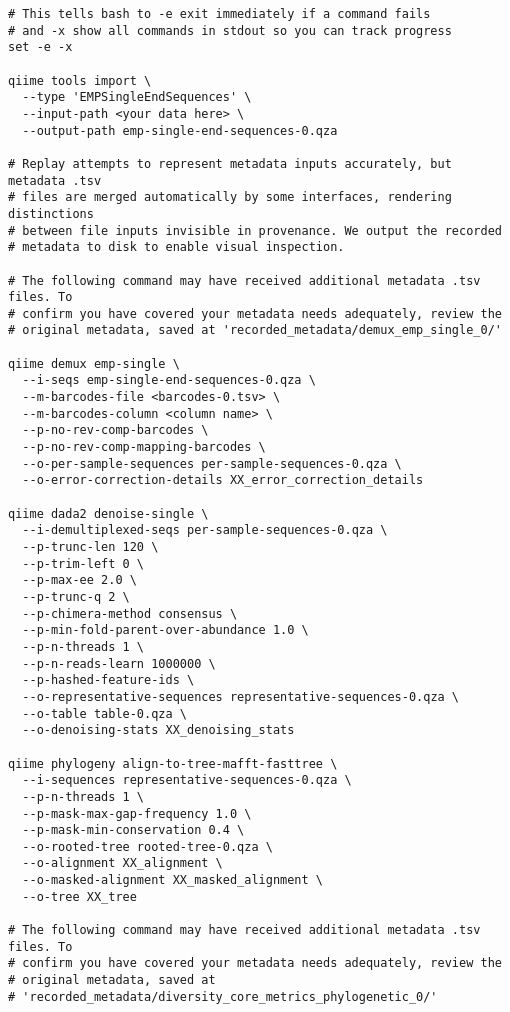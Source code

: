 \begin{footnotesize}
\begin{verbatim}
# This tells bash to -e exit immediately if a command fails
# and -x show all commands in stdout so you can track progress
set -e -x

qiime tools import \
  --type 'EMPSingleEndSequences' \
  --input-path <your data here> \
  --output-path emp-single-end-sequences-0.qza

# Replay attempts to represent metadata inputs accurately, but metadata .tsv
# files are merged automatically by some interfaces, rendering distinctions
# between file inputs invisible in provenance. We output the recorded
# metadata to disk to enable visual inspection.

# The following command may have received additional metadata .tsv files. To
# confirm you have covered your metadata needs adequately, review the
# original metadata, saved at 'recorded_metadata/demux_emp_single_0/'

qiime demux emp-single \
  --i-seqs emp-single-end-sequences-0.qza \
  --m-barcodes-file <barcodes-0.tsv> \
  --m-barcodes-column <column name> \
  --p-no-rev-comp-barcodes \
  --p-no-rev-comp-mapping-barcodes \
  --o-per-sample-sequences per-sample-sequences-0.qza \
  --o-error-correction-details XX_error_correction_details

qiime dada2 denoise-single \
  --i-demultiplexed-seqs per-sample-sequences-0.qza \
  --p-trunc-len 120 \
  --p-trim-left 0 \
  --p-max-ee 2.0 \
  --p-trunc-q 2 \
  --p-chimera-method consensus \
  --p-min-fold-parent-over-abundance 1.0 \
  --p-n-threads 1 \
  --p-n-reads-learn 1000000 \
  --p-hashed-feature-ids \
  --o-representative-sequences representative-sequences-0.qza \
  --o-table table-0.qza \
  --o-denoising-stats XX_denoising_stats

qiime phylogeny align-to-tree-mafft-fasttree \
  --i-sequences representative-sequences-0.qza \
  --p-n-threads 1 \
  --p-mask-max-gap-frequency 1.0 \
  --p-mask-min-conservation 0.4 \
  --o-rooted-tree rooted-tree-0.qza \
  --o-alignment XX_alignment \
  --o-masked-alignment XX_masked_alignment \
  --o-tree XX_tree

# The following command may have received additional metadata .tsv files. To
# confirm you have covered your metadata needs adequately, review the
# original metadata, saved at
# 'recorded_metadata/diversity_core_metrics_phylogenetic_0/'


\end{verbatim}
\end{footnotesize}
